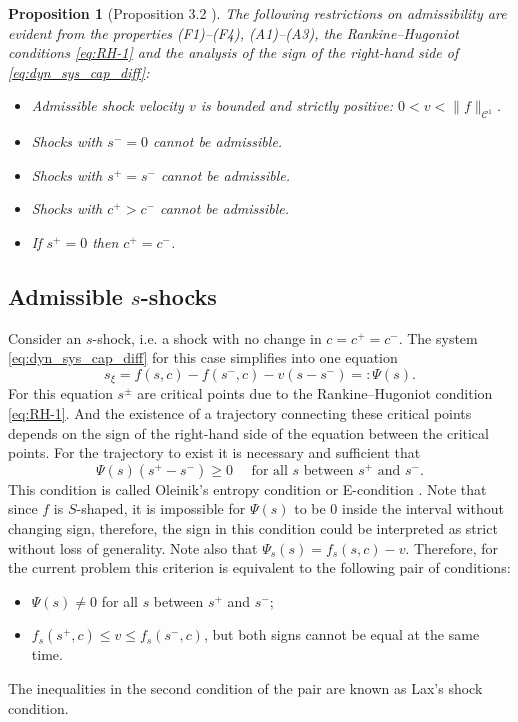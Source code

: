 \documentclass[12pt]{article}
\newtheorem{proposition}{Proposition}
\theoremstyle{definition}
\begin{document}
\begin{proposition}[Proposition 3.2 \cite{MR2024}]\label{prop:inadmissible_shocks}
The following restrictions on admissibility are evident from the properties (F1)--(F4), (A1)--(A3), the Rankine--Hugoniot conditions \eqref{eq:RH-1} and the analysis of the sign of the right-hand side of \eqref{eq:dyn_sys_cap_diff}:
\begin{itemize}
    \item Admissible shock velocity $v$ is bounded and strictly positive: $0 < v < \|f\|_{\mathcal C^1}$.
    \item Shocks with $s^- = 0$ cannot be admissible.
    \item Shocks with $s^+ = s^-$ cannot be admissible.
    \item Shocks with $c^+ > c^-$ cannot be admissible.
    \item If $s^+ = 0$ then $c^+=c^-$.
\end{itemize}
\end{proposition}

\subsection{Admissible $s$-shocks}
\label{sec:sec2-s-shocks}
Consider an $s$-shock, i.e. a shock with no change in $c = c^+ = c^-$. The system \eqref{eq:dyn_sys_cap_diff} for this case simplifies into one equation
\[
s_\xi = f(s, c) - f(s^-, c) - v (s - s^-) =: \Psi(s).
\]
For this equation $s^\pm$ are critical points due to the Rankine--Hugoniot condition \eqref{eq:RH-1}. And the existence of a trajectory connecting these critical points depends on the sign of the right-hand side of the equation between the critical points. For the trajectory to exist it is necessary and sufficient that
\begin{equation}\label{Oleinik_admissibility}
\Psi(s)(s^+-s^-) \geqslant 0 \quad \text{ for all } s \text{ between } s^+ \text{ and } s^-.
\end{equation}
This condition is called Oleinik's entropy condition or E-condition \cite{Oleinik}. Note that since $f$ is $S$-shaped, it is impossible for $\Psi(s)$ to be $0$ inside the interval without changing sign, therefore, the sign in this condition could be interpreted as strict without loss of generality. Note also that $\Psi_s(s) = f_s(s, c) - v$. Therefore, for the current problem this criterion is equivalent to the following pair of conditions:
\begin{itemize}
    \item $\Psi(s) \neq 0$ for all $s$ between $s^+$ and $s^-$;
    \item $f_s(s^+, c) \leqslant v \leqslant f_s(s^-, c)$, but both signs cannot be equal at the same time.
\end{itemize}
The inequalities in the second condition of the pair are known as Lax's shock condition.
\end{document}
